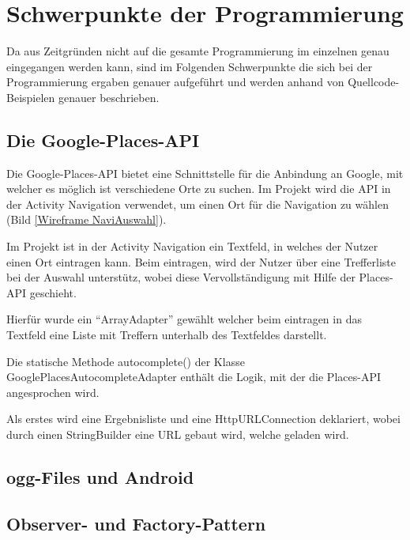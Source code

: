 \section{Schwerpunkte der Programmierung}
Da aus Zeitgr\"unden nicht auf die gesamte Programmierung im einzelnen genau eingegangen werden kann, sind im Folgenden Schwerpunkte die sich bei der Programmierung ergaben genauer aufgef\"uhrt und werden anhand von Quellcode-Beispielen genauer beschrieben.

\subsection{Die Google-Places-API}
Die Google-Places-\ac{API} bietet eine Schnittstelle f\"ur die Anbindung an Google, mit welcher es m\"oglich ist verschiedene Orte zu suchen. Im Projekt wird die \ac{API} in der Activity Navigation verwendet, um einen Ort f\"ur die Navigation zu w\"ahlen (Bild \ref{Wireframe NaviAuswahl}).

Im Projekt ist in der Activity Navigation ein Textfeld, in welches der Nutzer einen Ort eintragen kann. Beim eintragen, wird der Nutzer \"uber eine Trefferliste bei der Auswahl unterst\"utz, wobei diese Vervollst\"andigung mit Hilfe der Places-\ac{API} geschieht.

Hierf\"ur wurde ein "`ArrayAdapter"' gew\"ahlt welcher beim eintragen in das Textfeld eine Liste mit Treffern unterhalb des Textfeldes darstellt.

Die statische Methode autocomplete() der Klasse GooglePlacesAutocompleteAdapter enth\"alt die Logik, mit der die Places-\ac{API} angesprochen wird.

Als erstes wird eine Ergebnisliste und eine HttpURLConnection deklariert, wobei durch einen StringBuilder eine URL gebaut wird, welche geladen wird.


\subsection{ogg-Files und Android}
\cite{oggBug} \cite{oogStackOver}

\subsection{Observer- und Factory-Pattern}